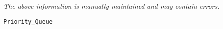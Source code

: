 \label{pkg:heap\_priority\_queue}

{\tiny \it The above information is manually maintained and may contain errors.}
\begin{verbatim}
Priority_Queue
\end{verbatim}
